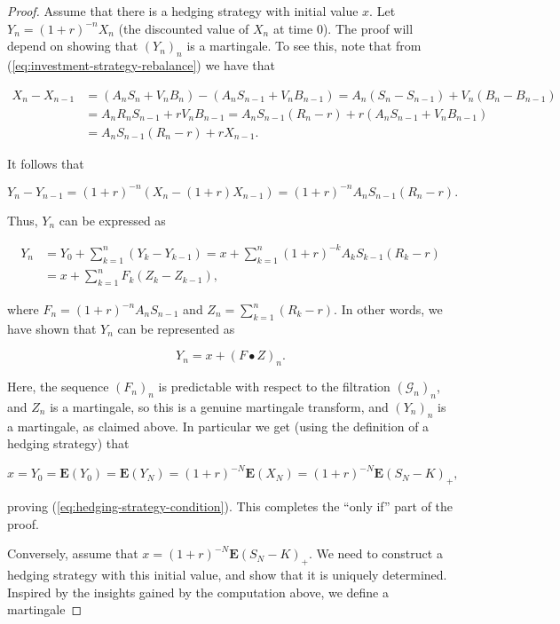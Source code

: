 \begin{proof}
Assume that there is a hedging strategy with initial
value $x$. Let $Y_n = (1+r)^{-n} X_n$ (the discounted
value of $X_n$ at time $0$). The proof will depend on
showing that $(Y_n)_n$ is a martingale. To see this,
note that from (\ref{eq:investment-strategy-rebalance}) we
have that

\begin{align*}
X_n - X_{n-1} &= (A_n S_n + V_n B_n) - (A_n S_{n-1} + V_n B_{n-1})
= A_n (S_n-S_{n-1}) + V_n (B_n-B_{n-1}) \\
&= A_n R_n S_{n-1} + r V_n B_{n-1} = A_n S_{n-1}(R_n-r) + r(A_n S_{n-1} + V_n B_{n-1}) \\
&= A_n S_{n-1} (R_n-r) + r X_{n-1}.
\end{align*}

\noindent It follows that

\[
Y_n-Y_{n-1} = (1+r)^{-n}(X_n-(1+r)X_{n-1}) = (1+r)^{-n}A_n S_{n-1}(R_n-r).
\]

\noindent Thus, $Y_n$ can be expressed as

\begin{align*}
Y_n &= Y_0 + \sum_{k=1}^n (Y_k-Y_{k-1}) =
x + \sum_{k=1}^n (1+r)^{-k}A_k S_{k-1} (R_k-r) \\
&= x + \sum_{k=1}^n F_k (Z_k-Z_{k-1}),
\end{align*}

\noindent where $F_n = (1+r)^{-n} A_n S_{n-1}$ and
$Z_n = \sum_{k=1}^n (R_k-r)$. In other words, we have
shown that $Y_n$ can be represented as

\[
Y_n = x + (F\bullet Z)_n.
\]

\noindent Here, the sequence $(F_n)_n$ is predictable with
respect to the filtration $(\mathcal{G}_n)_n$, and
$Z_n$ is a martingale, so this is a genuine
martingale transform, and $(Y_n)_n$ is a martingale,
as claimed above. In particular we get (using the
definition of a hedging strategy) that

\[
x = Y_0 = \mathbf{E}(Y_0) = \mathbf{E}(Y_N) = (1+r)^{-N} \mathbf{E}(X_N) = (1+r)^{-N} \mathbf{E}(S_N-K)_+,
\]

\noindent proving (\ref{eq:hedging-strategy-condition}). This
completes the ``only if'' part of the proof.

Conversely, assume that
$x=(1+r)^{-N} \mathbf{E}(S_N-K)_+$. We need to
construct a hedging strategy with this initial value,
and show that it is uniquely determined. Inspired by
the insights gained by the computation above, we
define a martingale


\end{proof}
